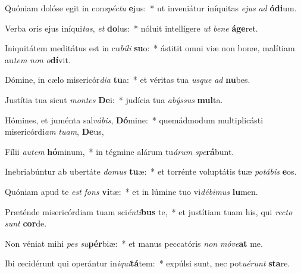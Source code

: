 \item Quóniam dolóse egit in con\textit{spéc}\textit{tu} \textbf{e}jus:~* ut inveniátur iníquitas \textit{e}\textit{jus} \textit{ad} \textbf{ó}\textbf{di}um.
\item Verba oris ejus iníqui\textit{tas}, \textit{et} \textbf{do}lus:~* nóluit intellígere \textit{ut} \textit{be}\textit{ne} \textbf{á}\textbf{ge}ret.
\item Iniquitátem meditátus est in cu\textit{bí}\textit{li} \textbf{su}o:~* ástitit omni viæ non bonæ, malítiam au\textit{tem} \textit{non} \textit{o}\textbf{dí}vit.
\item Dómine, in cælo misericór\textit{di}\textit{a} \textbf{tu}a:~* et véritas tua \textit{us}\textit{que} \textit{ad} \textbf{nu}bes.
\item Justítia tua sicut \textit{mon}\textit{tes} \textbf{De}i:~* judícia tua \textit{a}\textit{býs}\textit{sus} \textbf{mul}ta.
\item Hómines, et juménta sal\textit{vá}\textit{bis}, \textbf{Dó}mine:~* quemádmodum multiplicásti misericórdi\textit{am} \textit{tu}\textit{am}, \textbf{De}us,
\item Fílii \textit{au}\textit{tem} \textbf{hó}minum,~* in tégmine alárum tu\textit{á}\textit{rum} \textit{spe}\textbf{rá}bunt.
\item Inebriabúntur ab ubertáte \textit{do}\textit{mus} \textbf{tu}æ:~* et torrénte voluptátis tuæ \textit{po}\textit{tá}\textit{bis} \textbf{e}os.
\item Quóniam apud te \textit{est} \textit{fons} \textbf{vi}tæ:~* et in lúmine tuo vi\textit{dé}\textit{bi}\textit{mus} \textbf{lu}men.
\item Præténde misericórdiam tuam sci\textit{én}\textit{ti}\textbf{bus} te,~* et justítiam tuam his, qui \textit{rec}\textit{to} \textit{sunt} \textbf{cor}de.
\item Non véniat mihi \textit{pes} \textit{su}\textbf{pér}biæ:~* et manus peccatóris \textit{non} \textit{mó}\textit{ve}\textbf{at} me.
\item Ibi cecidérunt qui operántur in\textit{i}\textit{qui}\textbf{tá}tem:~* expúlsi sunt, nec pot\textit{u}\textit{é}\textit{runt} \textbf{sta}re.
